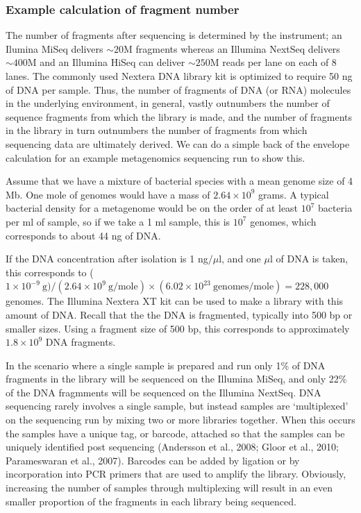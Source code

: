 \documentclass[twocolumn]{article}
\begin{document}
\subsubsection{Example calculation of fragment
number}\label{example-calculation-of-fragment-number}

The number of fragments after sequencing is determined by the
instrument; an Ilumina MiSeq delivers \(\sim 20\)M fragments whereas an
Illumina NextSeq delivers \(\sim 400\)M and an Illumina HiSeq can
deliver \(\sim 250\)M reads per lane on each of 8 lanes. The commonly
used Nextera DNA library kit is optimized to require 50 ng of DNA per
sample. Thus, the number of fragments of DNA (or RNA) molecules in the
underlying environment, in general, vastly outnumbers the number of
sequence fragments from which the library is made, and the number of
fragments in the library in turn outnumbers the number of fragments from
which sequencing data are ultimately derived. We can do a simple back of
the envelope calculation for an example metagenomics sequencing run to
show this.

Assume that we have a mixture of bacterial species with a mean genome
size of 4 Mb. One mole of genomes would have a mass of
\(2.64 \times 10^9\) grams. A typical bacterial density for a metagenome
would be on the order of at least \(10^7\) bacteria per ml of sample, so
if we take a 1 ml sample, this is \(10^7\) genomes, which corresponds to
about 44 ng of DNA.

If the DNA concentration after isolation is 1 ng\(/ \mu\)l, and one
\(\mu\)l of DNA is taken, this corresponds to
(\(1\times 10^{-9} \mathrm{\ g}) / (2.64 \times 10^9\ \mathrm{g/mole}) \times (6.02 \times 10^{23} \mathrm{\ genomes/mole}) = 228,000\)
genomes. The Illumina Nextera XT kit can be used to make a library with
this amount of DNA. Recall that the the DNA is fragmented, typically
into 500 bp or smaller sizes. Using a fragment size of 500 bp, this
corresponds to approximately \(1.8 \times 10^9\) DNA fragments.

In the scenario where a single sample is prepared and run only 1\% of
DNA fragments in the library will be sequenced on the Illumina MiSeq,
and only 22\% of the DNA fragmments will be sequenced on the Illumina
NextSeq. DNA sequencing rarely involves a single sample, but instead
samples are `multiplexed' on the sequencing run by mixing two or more
libraries together. When this occurs the samples have a unique tag, or
barcode, attached so that the samples can be uniquely identified post
sequencing (Andersson et al., 2008; Gloor et al., 2010; Parameswaran et
al., 2007). Barcodes can be added by ligation or by incorporation into
PCR primers that are used to amplify the library. Obviously, increasing
the number of samples through multiplexing will result in an even
smaller proportion of the fragments in each library being sequenced.
\end{document}
